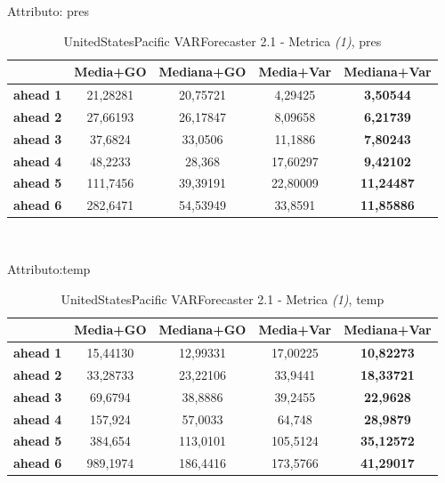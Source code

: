 \documentclass[12pt,a4paper,oneside,openright]{book}
\begin{document}
\medskip

Attributo: pres \\ 

\begin{table}[H]
\centering
\begin{tabular}{|c|c|c|c|c|}
\hline
 & \textbf{Media+GO} & \textbf{Mediana+GO} & \textbf{Media+Var} & \textbf{Mediana+Var} \\
\hline
\textbf{ahead 1} & 21,28281 & 20,75721 & 4,29425 & \textbf{3,50544} \\
\hline
\textbf{ahead 2} & 27,66193 & 26,17847 & 8,09658 & \textbf{6,21739} \\
\hline
\textbf{ahead 3} & 37,6824 & 33,0506 & 11,1886 & \textbf{7,80243} \\
\hline
\textbf{ahead 4} & 48,2233 & 28,368 & 17,60297 & \textbf{9,42102} \\
\hline
\textbf{ahead 5} & 111,7456 & 39,39191 & 22,80009 & \textbf{11,24487} \\
\hline
\textbf{ahead 6} & 282,6471 & 54,53949 & 33,8591 & \textbf{11,85886} \\
\hline
\end{tabular} \\
\caption{UnitedStatesPacific VARForecaster 2.1 - Metrica \textit{(1)}, pres}
\end{table}

\medskip

Attributo:temp \\ 

\begin{table}[H]
\centering
\begin{tabular}{|c|c|c|c|c|}
\hline
 & \textbf{Media+GO} & \textbf{Mediana+GO} & \textbf{Media+Var} & \textbf{Mediana+Var} \\
\hline
\textbf{ahead 1} & 15,44130 & 12,99331 & 17,00225 & \textbf{10,82273} \\
\hline
\textbf{ahead 2} & 33,28733 & 23,22106 & 33,9441 & \textbf{18,33721} \\
\hline
\textbf{ahead 3} & 69,6794 & 38,8886 & 39,2455 & \textbf{22,9628} \\
\hline
\textbf{ahead 4} & 157,924 & 57,0033 & 64,748 & \textbf{28,9879} \\
\hline
\textbf{ahead 5} & 384,654 & 113,0101 & 105,5124 & \textbf{35,12572} \\
\hline
\textbf{ahead 6} & 989,1974 & 186,4416 & 173,5766 & \textbf{41,29017} \\
\hline
\end{tabular} \\
\caption{UnitedStatesPacific VARForecaster 2.1 - Metrica \textit{(1)}, temp}
\end{table}
\end{document}

